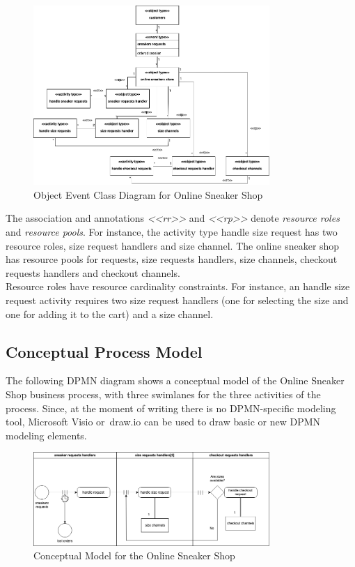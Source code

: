\documentclass{article}
\begin{document}
\begin{figure}[h]
    \centering
    \includegraphics[width=0.8\textwidth]{Object_Event_class_diagram}
    \caption{Object Event Class Diagram for Online Sneaker Shop}
\end{figure}

\FloatBarrier
The association and annotations {\em <<rr>>} and {\em <<rp>>} denote {\em resource roles} and {\em resource pools}. For instance, the activity type handle size request has two resource roles, size request handlers and size channel. The online sneaker shop has resource pools for requests, size requests handlers, size channels, checkout requests handlers and checkout channels.\\
Resource roles have resource cardinality constraints. For instance, an handle size request activity requires two size request handlers (one for selecting the size and one for adding it to the cart) and a size channel.

\subsection{Conceptual Process Model}
The following DPMN diagram shows a conceptual model of the Online Sneaker Shop business process, with three swimlanes for the three activities of the process. Since, at the moment of writing there is no DPMN-specific modeling tool, Microsoft Visio or draw.io can be used to draw basic or new DPMN modeling elements.

\begin{figure}[h]
    \centering
    \includegraphics[width=0.8\textwidth]{Online Shop}
    \caption{Conceptual Model for the Online Sneaker Shop}
\end{figure}
\end{document}
